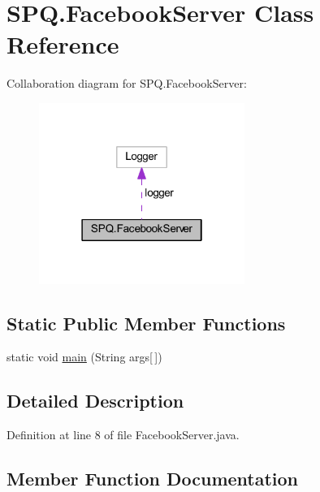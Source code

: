 \hypertarget{class_s_p_q_1_1_facebook_server}{}\section{S\+P\+Q.\+Facebook\+Server Class Reference}
\label{class_s_p_q_1_1_facebook_server}


Collaboration diagram for S\+P\+Q.\+Facebook\+Server\+:
\nopagebreak
\begin{figure}[H]
\begin{center}
\leavevmode
\includegraphics[width=190pt]{class_s_p_q_1_1_facebook_server__coll__graph}
\end{center}
\end{figure}
\subsection*{Static Public Member Functions}
\begin{DoxyCompactItemize}
\item 
static void \mbox{\hyperlink{class_s_p_q_1_1_facebook_server_aa8376542eaad78cc8894afbcc1dfc205}{main}} (String args\mbox{[}$\,$\mbox{]})
\end{DoxyCompactItemize}


\subsection{Detailed Description}


Definition at line 8 of file Facebook\+Server.\+java.



\subsection{Member Function Documentation}
\mbox{\label{class_s_p_q_1_1_facebook_server_aa8376542eaad78cc8894afbcc1dfc205}} 

